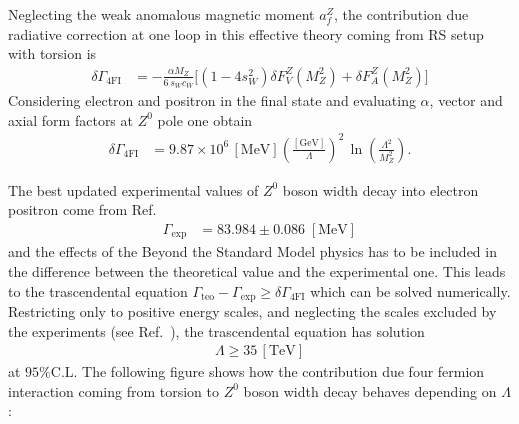 \documentclass[twocolumn,showpacs,showkeys,prd,superscriptaddress]{revtex4-1}
\begin{document}
Neglecting the weak anomalous magnetic moment $a_f^Z$, the contribution due radiative correction at one loop in this effective theory coming from RS setup with torsion is
\begin{align}
  \delta\Gamma_{\text{4FI}} &= -\frac{\alpha M_Z}{6\,s_Wc_W}\Bigg[(1 - 4s_W^2)\delta F_V^Z(M_Z^2) + \delta F_A^Z(M_Z^2)\Bigg]
\end{align}
Considering electron and positron in the final state and evaluating $\alpha$, vector and axial form factors at $Z^0$ pole one obtain 
\begin{align}
  \label{deltagammateo}
  \delta\Gamma_{\text{4FI}} &= 9.87\times10^6\,[\text{MeV}]\left(\frac{[\text{GeV}]}{\Lambda}\right)^2\,\ln\left(\frac{\Lambda^2}{M_Z^2}\right).
\end{align}

The best updated experimental values of $Z^0$ boson width decay into electron positron come from Ref.~\cite{Beringer:1900zz}
\begin{align}
  \label{deltagammaexp}
  \Gamma_{\text{exp}} &= 83.984 \pm 0.086\;[\text{MeV}] 
\end{align}
and the effects of the Beyond the Standard Model physics has to be included in the difference between the theoretical value and the experimental one. This leads to the trascendental equation $\Gamma_{\text{teo}} - \Gamma_{\text{exp}}\geq \delta\Gamma_{\text{4FI}}$ which can be solved numerically. Restricting only to positive energy scales, and neglecting the scales excluded by the experiments (see Ref.~\cite{Chatrchyan:2013muj}), the trascendental equation has solution
\begin{eqnarray}
  \Lambda \geq 35\,[\text{TeV}]
\end{eqnarray}
at $95\% \text{C.L}$. The following figure shows how the contribution due four fermion interaction coming from torsion to $Z^0$ boson width decay behaves depending on $\Lambda$ :
\vspace{0.4cm}
\end{document}
